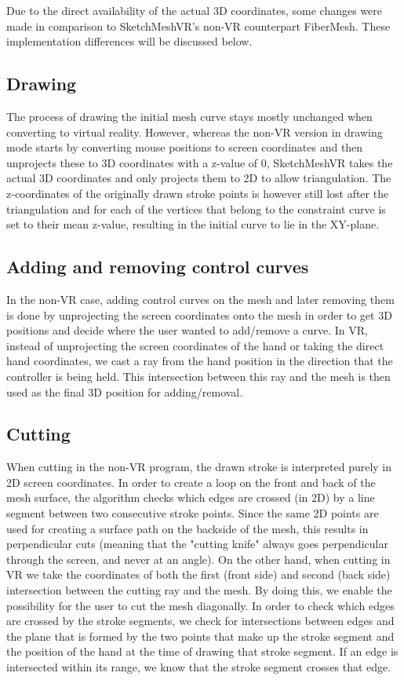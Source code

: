 Due to the direct availability of the actual 3D coordinates, some changes were made in comparison to SketchMeshVR's non-VR counterpart FiberMesh. These implementation differences will be discussed below.

\subsection{Drawing}
The process of drawing the initial mesh curve stays mostly unchanged when converting to virtual reality. However, whereas the non-VR version in drawing mode starts by converting mouse positions to screen coordinates and then unprojects these to 3D coordinates with a z-value of 0, SketchMeshVR takes the actual 3D coordinates and only projects them to 2D to allow triangulation. The z-coordinates of the originally drawn stroke points is however still lost after the triangulation and for each of the vertices that belong to the constraint curve is set to their mean z-value, resulting in the initial curve to lie in the XY-plane.

\subsection{Adding and removing control curves}
In the non-VR case, adding control curves on the mesh and later removing them is done by unprojecting the screen coordinates onto the mesh in order to get 3D positions and decide where the user wanted to add/remove a curve. In VR, instead of unprojecting the screen coordinates of the hand or taking the direct hand coordinates, we cast a ray from the hand position in the direction that the controller is being held. This intersection between this ray and the mesh is then used as the final 3D position for adding/removal.

\subsection{Cutting}
When cutting in the non-VR program, the drawn stroke is interpreted purely in 2D screen coordinates. In order to create a loop on the front and back of the mesh surface, the algorithm checks which edges are crossed (in 2D) by a line segment between two consecutive stroke points. Since the same 2D points are used for creating a surface path on the backside of the mesh, this results in perpendicular cuts (meaning that the "cutting knife" always goes perpendicular through the screen, and never at an angle). On the other hand, when cutting in VR we take the coordinates of both the first (front side) and second (back side) intersection between the cutting ray and the mesh. By doing this, we enable the possibility for the user to cut the mesh diagonally. In order to check which edges are crossed by the stroke segments, we check for intersections between edges and the plane that is formed by the two points that make up the stroke segment and the position of the hand at the time of drawing that stroke segment. If an edge is intersected within its range, we know that the stroke segment crosses that edge. 

